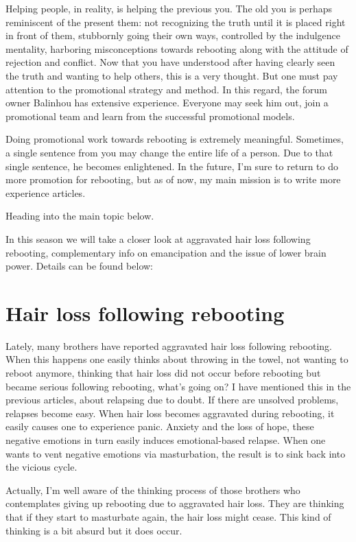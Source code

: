 \documentclass[
]{book}
\begin{document}
Helping people, in reality, is helping the previous you. The old you is perhaps reminiscent of the present them: not recognizing the truth until it is placed right in front of them, stubbornly going their own ways, controlled by the indulgence mentality, harboring misconceptions towards rebooting along with the attitude of rejection and conflict. Now that you have understood after having clearly seen the truth and wanting to help others, this is a very thought. But one must pay attention to the promotional strategy and method. In this regard, the forum owner Balinhou has extensive experience. Everyone may seek him out, join a promotional team and learn from the successful promotional models.

Doing promotional work towards rebooting is extremely meaningful. Sometimes, a single sentence from you may change the entire life of a person. Due to that single sentence, he becomes enlightened. In the future, I'm sure to return to do more promotion for rebooting, but as of now, my main mission is to write more experience articles.

Heading into the main topic below.

In this season we will take a closer look at aggravated hair loss following rebooting, complementary info on emancipation and the issue of lower brain power. Details can be found below:

\hypertarget{hair-loss-following-rebooting}{%
\section{Hair loss following rebooting}\label{hair-loss-following-rebooting}}

Lately, many brothers have reported aggravated hair loss following rebooting. When this happens one easily thinks about throwing in the towel, not wanting to reboot anymore, thinking that hair loss did not occur before rebooting but became serious following rebooting, what's going on? I have mentioned this in the previous articles, about relapsing due to doubt. If there are unsolved problems, relapses become easy. When hair loss becomes aggravated during rebooting, it easily causes one to experience panic. Anxiety and the loss of hope, these negative emotions in turn easily induces emotional-based relapse. When one wants to vent negative emotions via masturbation, the result is to sink back into the vicious cycle.

Actually, I'm well aware of the thinking process of those brothers who contemplates giving up rebooting due to aggravated hair loss. They are thinking that if they start to masturbate again, the hair loss might cease. This kind of thinking is a bit absurd but it does occur.
\end{document}
